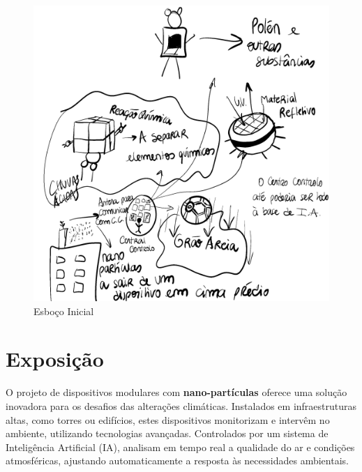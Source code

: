 \documentclass[a4paper, 11pt, onecolumn, oneside]{report}
\begin{document}
\begin{figure}[ht]
    \centering
    \includegraphics[scale=0.13]{images/esboco_inicial.jpg}
    \caption{Esboço Inicial}
    \label{fig:esboco_inicial}
\end{figure}

\section{Exposição}
O projeto de dispositivos modulares com \textbf{nano-partículas} oferece uma solução inovadora para os desafios das alterações climáticas. Instalados em infraestruturas altas, como torres ou edifícios, estes dispositivos monitorizam e intervêm no ambiente, utilizando tecnologias avançadas. Controlados por um sistema de Inteligência Artificial (IA), analisam em tempo real a qualidade do ar e condições atmosféricas, ajustando automaticamente a resposta às necessidades ambientais.
   
\end{document}
